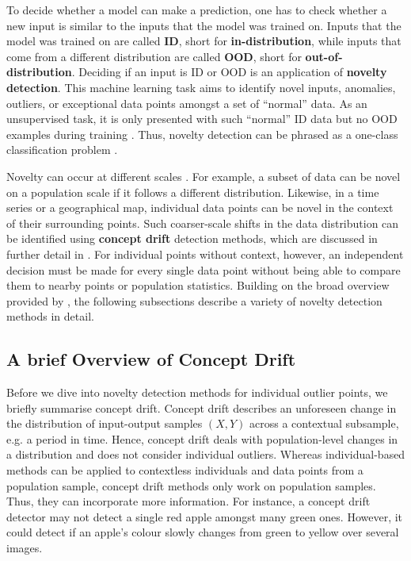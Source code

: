 \newpar To decide whether a model can make a prediction, one has to check whether a new input is similar to the inputs that the model was trained on. Inputs that the model was trained on are called \textbf{ID}, short for \textbf{in-distribution}, while inputs that come from a different distribution are called \textbf{OOD}, short for \textbf{out-of-distribution}. Deciding if an input is ID or OOD is an application of \textbf{novelty detection}. This machine learning task aims to identify novel inputs, anomalies, outliers, or exceptional data points amongst a set of ``normal'' data. As an unsupervised task, it is only presented with such ``normal'' ID data but no OOD examples during training \cite{novelty-detection-2010}. Thus, novelty detection can be phrased as a one-class classification problem \cite{ood-svm-1999}.

Novelty can occur at different scales \cite{novelty-detection-2010}. For example, a subset of data can be novel on a population scale if it follows a different distribution. Likewise, in a time series or a geographical map, individual data points can be novel in the context of their surrounding points. Such coarser-scale shifts in the data distribution can be identified using \textbf{concept drift} detection methods, which are discussed in further detail in . For individual points without context, however, an independent decision must be made for every single data point without being able to compare them to nearby points or population statistics. Building on the broad overview provided by \textcite{novelty-detection-2010}, the following subsections describe a variety of novelty detection methods in detail.

\subsection{A brief Overview of Concept Drift} \label{txt:concept-drift}

Before we dive into novelty detection methods for individual outlier points, we briefly summarise concept drift. Concept drift describes an unforeseen change \cite{concept-drift-definition-2019} in the distribution of input-output samples $(X, Y)$ across a contextual subsample, e.g. a period in time. Hence, concept drift deals with population-level changes in a distribution and does not consider individual outliers. Whereas individual-based methods can be applied to contextless individuals and data points from a population sample, concept drift methods only work on population samples. Thus, they can incorporate more information. For instance, a concept drift detector may not detect a single red apple amongst many green ones. However, it could detect if an apple's colour slowly changes from green to yellow over several images.

